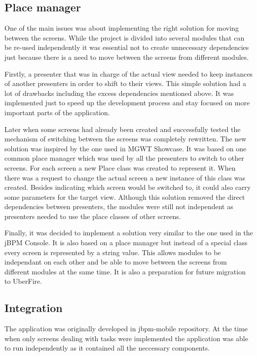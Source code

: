 \documentclass[12pt,oneside,final]{fithesis2}
\begin{document}
\subsection{Place manager}
One of the main issues was about implementing the right solution for moving between the screens.
While the project is divided into several modules that can be re-used independently it was essential not to create unnecessary dependencies just because there is a need to move between the screens from different modules.

Firstly, a presenter that was in charge of the actual view needed to keep instances of another presenters in order to shift to their views.
This simple solution had a lot of drawbacks including the excess dependencies mentioned above.
It was implemented just to speed up the development process and stay focused on more important parts of the application.

Later when some screens had already been created and successfully tested the mechanism of switching between the screens was completely rewritten.
The new solution was inspired by the one used in MGWT Showcase\footnotemark{}.
It was based on one common place manager which was used by all the presenters to switch to other screens.
For each screen a new Place class was created to represent it.
When there was a request to change the actual screen a new instance of this class was created.
Besides indicating which screen would be switched to, it could also carry some parameters for the target view.
Although this solution removed the direct dependencies between presenters, the modules were still not independent as presenters needed to use the place classes of other screens.

Finally, it was decided to implement a solution very similar to the one used in the jBPM Console.
It is also based on a place manager but instead of a special class every screen is represented by a string value.
This allows modules to be independant on each other and be able to move between the screens from different modules at the same time.
It is also a preparation for future migration to UberFire.

\subsection{Integration}
\label{subsec:integration}
The application was originally developed in jbpm-mobile\footnotemark{} repository.
At the time when only screens dealing with tasks were implemented the application was able to run independently as it contained all the neccessary components.
\end{document}
